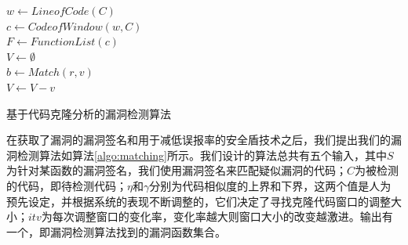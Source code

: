 \begin{algorithm}[htbp]
	\small
    $w \leftarrow LineofCode(C)$ \\
    $c \leftarrow CodeofWindow(w,C)$ \\
    $F \leftarrow FunctionList(c)$ \\
    $V \leftarrow \emptyset$ \\
     {
    }
     {
         {
            $b \leftarrow Match(r, v)$ \\
             {
                $V \leftarrow V - v$ \\
            }
        }
    }
	\caption{基于代码克隆分析的漏洞检测算法}\label{algo:matching}
\end{algorithm}


在获取了漏洞的漏洞签名和用于减低误报率的安全盾技术之后，我们提出我们的漏洞检测算法如算法\ref{algo:matching}所示。我们设计的算法总共有五个输入，其中$S$为针对某函数的漏洞签名，我们使用漏洞签名来匹配疑似漏洞的代码；$C$为被检测的代码，即待检测代码；$\eta$和$\gamma$分别为代码相似度的上界和下界，这两个值是人为预先设定，并根据系统的表现不断调整的，它们决定了寻找克隆代码窗口的调整大小；$itv$为每次调整窗口的变化率，变化率越大则窗口大小的改变越激进。输出有一个，即漏洞检测算法找到的漏洞函数集合。

